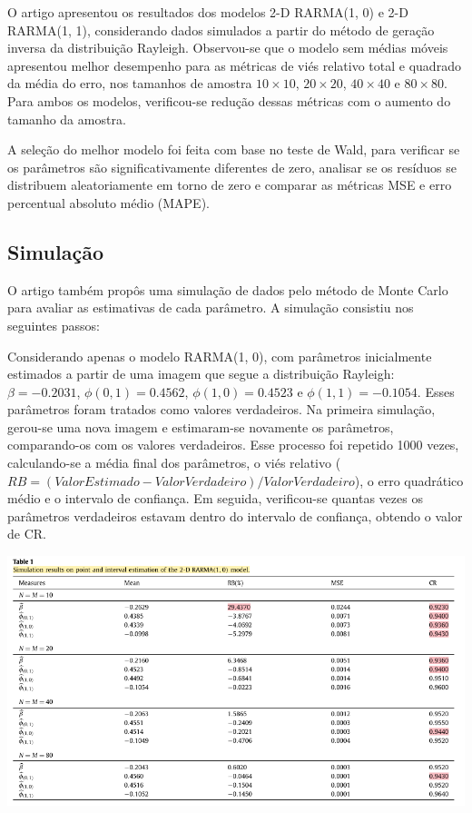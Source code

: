\documentclass[
]{article}
\begin{document}
O artigo apresentou os resultados dos modelos 2-D RARMA(1, 0) e 2-D RARMA(1, 1), considerando dados simulados a partir do método de geração inversa da distribuição Rayleigh. Observou-se que o modelo sem médias móveis apresentou melhor desempenho para as métricas de viés relativo total e quadrado da média do erro, nos tamanhos de amostra \(10\times10\), \(20\times20\), \(40\times40\) e \(80\times80\). Para ambos os modelos, verificou-se redução dessas métricas com o aumento do tamanho da amostra.

A seleção do melhor modelo foi feita com base no teste de Wald, para verificar se os parâmetros são significativamente diferentes de zero, analisar se os resíduos se distribuem aleatoriamente em torno de zero e comparar as métricas MSE e erro percentual absoluto médio (MAPE).

\hypertarget{simulauxe7uxe3o}{%
\subsection{Simulação}\label{simulauxe7uxe3o}}

O artigo também propôs uma simulação de dados pelo método de Monte Carlo para avaliar as estimativas de cada parâmetro. A simulação consistiu nos seguintes passos:

Considerando apenas o modelo RARMA(1, 0), com parâmetros inicialmente estimados a partir de uma imagem que segue a distribuição Rayleigh: \(\beta = -0.2031\), \(\phi(0,1) = 0.4562\), \(\phi(1, 0) = 0.4523\) e \(\phi(1,1) = -0.1054\). Esses parâmetros foram tratados como valores verdadeiros. Na primeira simulação, gerou-se uma nova imagem e estimaram-se novamente os parâmetros, comparando-os com os valores verdadeiros. Esse processo foi repetido 1000 vezes, calculando-se a média final dos parâmetros, o viés relativo (\(RB = (ValorEstimado - ValorVerdadeiro) / ValorVerdadeiro\)), o erro quadrático médio e o intervalo de confiança. Em seguida, verificou-se quantas vezes os parâmetros verdadeiros estavam dentro do intervalo de confiança, obtendo o valor de CR.

\begin{center}\includegraphics[width=0.6\linewidth]{table_1} \end{center}
\end{document}
